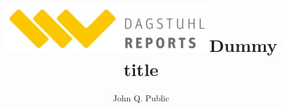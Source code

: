 \documentclass[a4paper,USenglish]{dagrep-master-v2021}
\title{\includegraphics[width=0.67\textwidth]{dagrep-logo-color}}
\begin{document}
\maketitle


\begin{contentslist}

\contitem
\title{Dummy title}
\author{John Q. Public}

\end{contentslist}

\bigskip

\vfill


\bottomline



\end{document}
